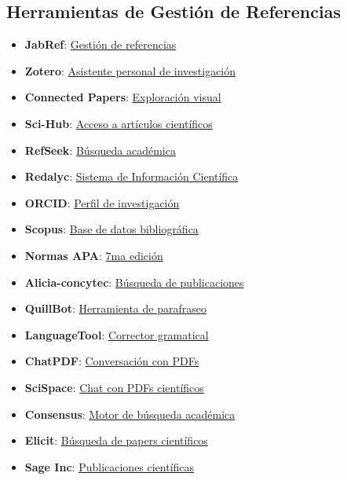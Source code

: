 \documentclass[
  jou,
  floatsintext,
  longtable,
  a4paper,
  nolmodern,
  notxfonts,
  notimes,
  colorlinks=true,linkcolor=blue,citecolor=blue,urlcolor=blue]{apa7}
\providecommand{\tightlist}{%
  \setlength{\itemsep}{0pt}\setlength{\parskip}{0pt}}
\begin{document}
\subsection{Herramientas de Gestión de
Referencias}\label{herramientas-de-gestiuxf3n-de-referencias}

\begin{itemize}
\tightlist
\item
  \textbf{JabRef}: \href{https://www.jabref.org/}{Gestión de
  referencias}
\item
  \textbf{Zotero}: \href{https://www.zotero.org/}{Asistente personal de
  investigación}
\item
  \textbf{Connected Papers}:
  \href{https://www.connectedpapers.com/}{Exploración visual}
\item
  \textbf{Sci-Hub}: \href{https://sci-hub.hkvisa.net/}{Acceso a
  artículos científicos}
\item
  \textbf{RefSeek}: \href{https://www.refseek.com/}{Búsqueda académica}
\item
  \textbf{Redalyc}: \href{https://www.redalyc.org/}{Sistema de
  Información Científica}
\item
  \textbf{ORCID}: \href{https://orcid.org/}{Perfil de investigación}
\item
  \textbf{Scopus}:
  \href{https://www.scopus.com/standard/marketing.uri}{Base de datos
  bibliográfica}
\item
  \textbf{Normas APA}: \href{https://normas-apa.org/}{7ma edición}
\item
  \textbf{Alicia-concytec}:
  \href{https://alicia.concytec.gob.pe/vufind/}{Búsqueda de
  publicaciones}
\item
  \textbf{QuillBot}: \href{https://quillbot.com/}{Herramienta de
  parafraseo}
\item
  \textbf{LanguageTool}: \href{https://languagetool.org/}{Corrector
  gramatical}
\item
  \textbf{ChatPDF}: \href{https://www.chatpdf.com/}{Conversación con
  PDFs}
\item
  \textbf{SciSpace}: \href{https://typeset.io/}{Chat con PDFs
  científicos}
\item
  \textbf{Consensus}: \href{https://consensus.app/}{Motor de búsqueda
  académica}
\item
  \textbf{Elicit}:
  \href{https://elicit.com/?workflow=table-of-papers}{Búsqueda de papers
  científicos}
\item
  \textbf{Sage Inc}:
  \href{https://us.sagepub.com/en-us/sam/home}{Publicaciones
  científicas}

\end{itemize}
\end{document}
